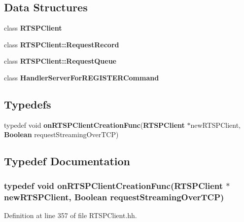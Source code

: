 \subsection*{Data Structures}
\begin{DoxyCompactItemize}
\item 
class {\bf R\+T\+S\+P\+Client}
\item 
class {\bf R\+T\+S\+P\+Client\+::\+Request\+Record}
\item 
class {\bf R\+T\+S\+P\+Client\+::\+Request\+Queue}
\item 
class {\bf Handler\+Server\+For\+R\+E\+G\+I\+S\+T\+E\+R\+Command}
\end{DoxyCompactItemize}
\subsection*{Typedefs}
\begin{DoxyCompactItemize}
\item 
typedef void {\bf on\+R\+T\+S\+P\+Client\+Creation\+Func}({\bf R\+T\+S\+P\+Client} $\ast$new\+R\+T\+S\+P\+Client, {\bf Boolean} request\+Streaming\+Over\+T\+C\+P)
\end{DoxyCompactItemize}


\subsection{Typedef Documentation}
\subsubsection[{on\+R\+T\+S\+P\+Client\+Creation\+Func}]{\setlength{\rightskip}{0pt plus 5cm}typedef void on\+R\+T\+S\+P\+Client\+Creation\+Func({\bf R\+T\+S\+P\+Client} $\ast$new\+R\+T\+S\+P\+Client, {\bf Boolean} request\+Streaming\+Over\+T\+C\+P)}\label{RTSPClient_8hh_a7f3abb5b14d68516953174e5808b1b8a}


Definition at line 357 of file R\+T\+S\+P\+Client.\+hh.

